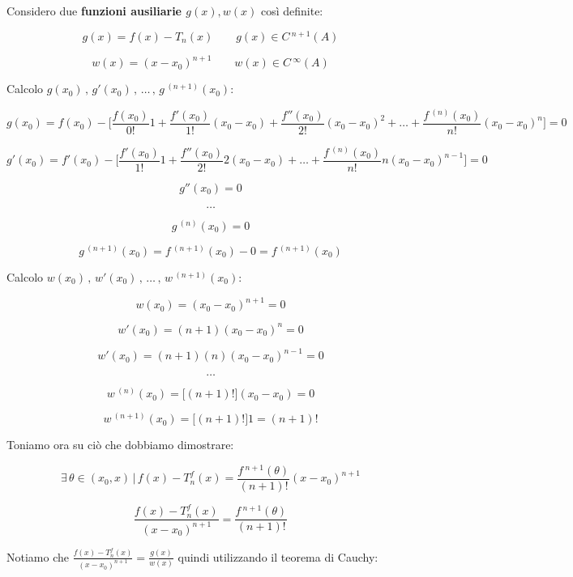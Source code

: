 \documentclass[../dimostrazioni]{subfiles}
\begin{document}
            \medskip

            Considero due \textbf{funzioni ausiliarie \(g(x), w(x)\)} così definite:

            \[  g(x) = f(x) - T_n (x) \qquad g(x) \in C\,^{n+1} (A)  \]

            \[  w(x) = (x - x_0)^{n+1} \qquad w(x) \in C\,^{\infty} (A)  \]

            Calcolo \( g(x_0)\, , \, g'(x_0)\, ,\, \dots\, , \, g \,^{(n+1)}(x_0)  \):
            
            \[  g(x_0) = f(x_0) - \bigg[\frac{f(x_0)}{0!}1 + \frac{f'(x_0)}{1!}(x_0-x_0) + \frac{f''(x_0)}{2!}(x_0-x_0)^2 + \dots + \frac{f\,^{(n)}(x_0)}{n!}(x_0-x_0)^n \bigg] = 0\]

            \[  g'(x_0) = f'(x_0) - \bigg[\frac{f'(x_0)}{1!}1 + \frac{f''(x_0)}{2!}2(x_0-x_0) + \dots + \frac{f\,^{(n)}(x_0)}{n!}n(x_0-x_0)^{n-1} \bigg] = 0 \]
    
            \[  g''(x_0) = 0    \]
            
            \[  \dots \]

            \[  g\,^{(n)} (x_0) = 0   \]

            \[  g\,^{(n+1)} (x_0) = f\,^{(n+1)}(x_0) - 0 = f\,^{(n+1)}(x_0)   \]

            Calcolo \( w(x_0)\, , \, w'(x_0)\, ,\, \dots\, , \, w \,^{(n+1)}(x_0)  \):

            \[  w(x_0) = (x_0 - x_0)^{n+1} = 0  \]

            \[  w'(x_0) = (n+1)(x_0 - x_0)^{n} = 0  \]

            \[  w'(x_0) = (n+1)(n)(x_0 - x_0)^{n-1} = 0  \]

            \[  \dots \]

            \[  w\,^{(n)} (x_0) = \big[(n+1)!\big](x_0 - x_0) = 0   \]

            \[  w\,^{(n+1)} (x_0) = \big[(n+1)!\big] 1 = (n+1)!   \]

            Toniamo ora su ciò che dobbiamo dimostrare:

            \[  \exists \, \theta \in (x_0, x) \, | \, f(x) - T _n ^ f (x) = \frac{f\,^{n+1}(\theta)}{(n+1)!}(x-x_0)^{n+1} \]

            \[  \frac{f(x) - T _n ^ f (x)}{(x-x_0)^{n+1}} = \frac{f\,^{n+1}(\theta)}{(n+1)!}    \]

            Notiamo che \(  \frac{f(x) - T _n ^ f (x)}{(x-x_0)^{n+1}} = \frac{g(x)}{w(x)}    \) quindi utilizzando il teorema di Cauchy:

            



        
\end{document}

